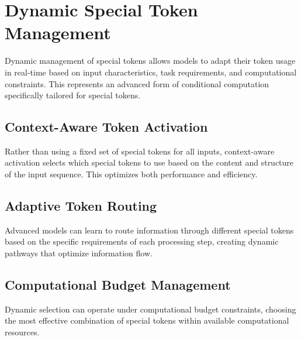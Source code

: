 \section{Dynamic Special Token Management}

Dynamic management of special tokens allows models to adapt their token usage in real-time based on input characteristics, task requirements, and computational constraints. This represents an advanced form of conditional computation specifically tailored for special tokens.

\subsection{Context-Aware Token Activation}

Rather than using a fixed set of special tokens for all inputs, context-aware activation selects which special tokens to use based on the content and structure of the input sequence. This optimizes both performance and efficiency.

\subsection{Adaptive Token Routing}

Advanced models can learn to route information through different special tokens based on the specific requirements of each processing step, creating dynamic pathways that optimize information flow.

\subsection{Computational Budget Management}

Dynamic selection can operate under computational budget constraints, choosing the most effective combination of special tokens within available computational resources.